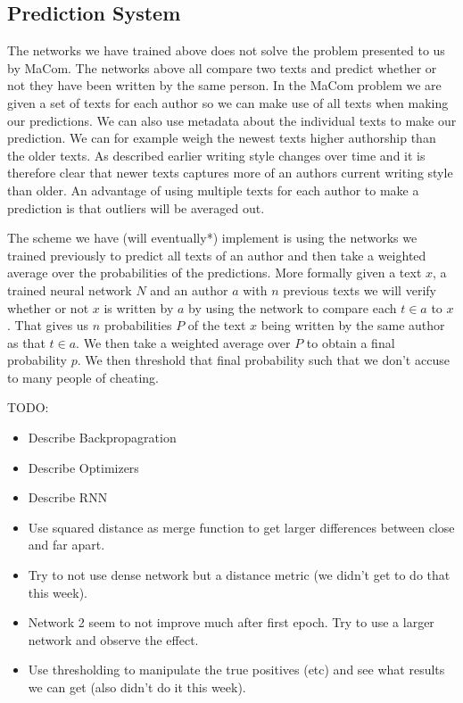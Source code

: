 \subsection{Prediction System}

The networks we have trained above does not solve the problem presented to us
by MaCom. The networks above all compare two texts and predict whether or not
they have been written by the same person. In the MaCom problem we are given a
set of texts for each author so we can make use of all texts when making our
predictions. We can also use metadata about the individual texts to make our
prediction. We can for example weigh the newest texts higher authorship than
the older texts. As described earlier writing style changes over time and it is
therefore clear that newer texts captures more of an authors current writing
style than older. An advantage of using multiple texts for each author to make a
prediction is that outliers will be averaged out.

The scheme we have (will eventually*) implement is using the networks we trained
previously to predict all texts of an author and then take a weighted average
over the probabilities of the predictions. More formally given a text $x$, a
trained neural network $N$ and an author $a$ with $n$ previous texts we will
verify whether or not $x$ is written by $a$ by using the network to compare each
$t \in a$ to $x$. That gives us $n$ probabilities $P$ of the text $x$ being
written by the same author as that $t \in a$. We then take a weighted average
over $P$ to obtain a final probability $p$. We then threshold that final
probability such that we don't accuse to many people of cheating.

TODO:
\begin{itemize}
    \item Describe Backpropagration
    \item Describe Optimizers
    \item Describe RNN
    \item Use squared distance as merge function to get larger differences
        between close and far apart.
    \item Try to not use dense network but a distance metric (we didn't get to
        do that this week).
    \item Network 2 seem to not improve much after first epoch. Try to use a
        larger network and observe the effect.
    \item Use thresholding to manipulate the true positives (etc) and see what
        results we can get (also didn't do it this week).
\end{itemize}

